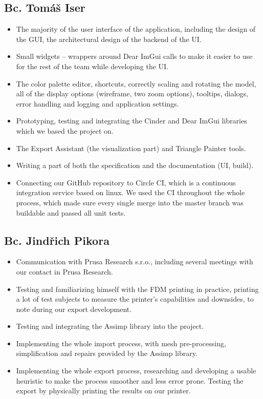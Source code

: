 \subsection{Bc. Tomáš Iser}
\begin{itemize}
\item The majority of the user interface of the application, including the design of the GUI, the architectural design of the backend of the UI.
\item Small widgets -- wrappers around Dear ImGui calls to make it easier to use for the rest of the team while developing the UI.
\item The color palette editor, shortcuts, correctly scaling and rotating the model, all of the display options (wireframe, two zoom options), tooltips, dialogs, error handling and logging and application settings.
\item Prototyping, testing and integrating the Cinder and Dear ImGui libraries which we based the project on.
\item The Export Assistant (the visualization part) and Triangle Painter tools.
\item Writing a part of both the specification and the documentation (UI, build).
\item Connecting our GitHub repository to Circle CI, which is a continuous integration service based on linux. We used the CI throughout the whole process, which made sure every single merge into the master branch was buildable and passed all unit tests.
\end{itemize}

\subsection{Bc. Jindřich Pikora}
\begin{itemize}
\item Communication with Prusa Research s.r.o., including several meetings with our contact in Prusa Research.
\item Testing and familiarizing himself with the FDM printing in practice, printing a lot of test subjects to measure the printer's capabilities and downsides, to note during our export development.
\item Testing and integrating the Assimp library into the project.
\item Implementing the whole import process, with mesh pre-processing, simplification and repairs provided by the Assimp library.
\item Implementing the whole export process, researching and developing a usable heuristic to make the process smoother and less error prone. Testing the export by physically printing the results on our printer.
\end{itemize}

